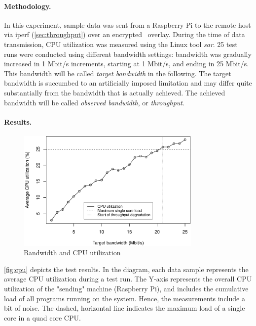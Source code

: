 \paragraph{Methodology.} In this experiment, sample data was sent from a Raspberry Pi to the remote host via iperf (\cf \autoref{sec:throughput}) over an encrypted \wnet\ overlay. During the time of data transmission, CPU utilization was measured using the Linux tool \emph{sar}. 25 test runs were conducted using different bandwidth settings: bandwidth was gradually increased in 1 Mbit/s increments, starting at 1 Mbit/s, and ending in 25 Mbit/s. This bandwidth will be called \emph{target bandwidth} in the following. The target bandwidth is succumbed to an artificially imposed limitation and may differ quite substantially from the bandwidth that is actually achieved. The achieved bandwidth will be called \emph{observed bandwidth}, or \emph{throughput}.

\paragraph{Results.} 

\begin{figure}[htpb]
  \centering
  \includegraphics[width=0.8\textwidth]{figures/cpu}
  \caption[Weave CPU utilization test results]{Bandwidth and CPU utilization}\label{fig:cpu}
\end{figure}

\autoref{fig:cpu} depicts the test results. In the diagram, each data sample represents the average CPU utilization during a test run. The Y-axis represents the overall CPU utilization of the "sending" machine (Raspberry Pi), and includes the cumulative load of all programs running on the system. Hence, the measurements include a bit of noise. The dashed, horizontal line indicates the maximum load of a single core in a quad core CPU.

